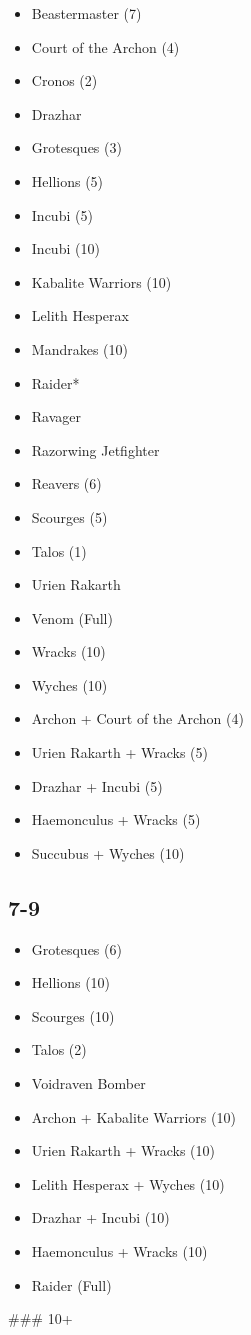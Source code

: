 \documentclass{HordeModeTarot}
\begin{document}
\begin{multicols}{2}
\begin{itemize}[leftmargin=*]
\item[] Beastermaster (7)
\item[] Court of the Archon (4)
\item[] Cronos (2)
\item[] Drazhar
\item[] Grotesques (3)
\item[] Hellions (5)
\item[] Incubi (5)
\item[] Incubi (10)
\item[] Kabalite Warriors (10)
\item[] Lelith Hesperax
\item[] Mandrakes (10)
\item[] Raider*
\item[] Ravager
\item[] Razorwing Jetfighter
\item[] Reavers (6)
\item[] Scourges (5)
\item[] Talos (1)
\item[] Urien Rakarth
\item[] Venom  (Full)
\item[] Wracks (10)
\item[] Wyches (10)
\item[] Archon + Court of the Archon (4)
\item[] Urien Rakarth + Wracks (5)
\item[] Drazhar + Incubi (5)
\item[] Haemonculus + Wracks (5)
\item[] Succubus + Wyches (10)
\end{itemize}

\subsection*{7-9}

\begin{itemize}[leftmargin=*]
\item[] Grotesques (6)
\item[] Hellions (10)
\item[] Scourges (10)
\item[] Talos (2)
\item[] Voidraven Bomber
\item[] Archon + Kabalite Warriors (10)
\item[] Urien Rakarth + Wracks (10)
\item[] Lelith Hesperax + Wyches (10)
\item[] Drazhar + Incubi (10)
\item[] Haemonculus + Wracks (10)
\item[] Raider (Full)
\end{itemize}

\#\#\# 10+



\end{multicols}
\end{document}
